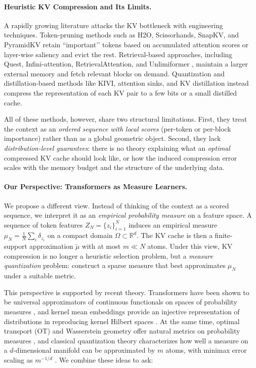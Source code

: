 \documentclass{article}
\theoremstyle{plain}
\theoremstyle{definition}
\theoremstyle{remark}
\begin{document}
\paragraph{Heuristic KV Compression and Its Limits.}
A rapidly growing literature attacks the KV bottleneck with engineering techniques. Token-pruning methods such as H2O, Scissorhands, SnapKV, and PyramidKV \citep{zhang2024h2o,liu2024scissorhands,li2024snapkv,zhang2024pyramidkv,ge2024model} retain “important’’ tokens based on accumulated attention scores or layer-wise saliency and evict the rest. Retrieval-based approaches, including Quest, Infini-attention, RetrievalAttention, and Unlimiformer \citep{tang2024quest,munkhdalai2024leave,gao2024retrieval,bertsch2024unlimiformer}, maintain a larger external memory and fetch relevant blocks on demand. Quantization and distillation-based methods like KIVI, attention sinks, and KV distillation \citep{liu2024kivi,xiao2024efficient,nawrot2024attention} instead compress the representation of each KV pair to a few bits or a small distilled cache.

All of these methods, however, share two structural limitations. First, they treat the context as an \emph{ordered sequence with local scores} (per-token or per-block importance) rather than as a global geometric object. Second, they lack \emph{distribution-level guarantees}: there is no theory explaining what an \emph{optimal} compressed KV cache should look like, or how the induced compression error scales with the memory budget and the structure of the underlying data.

\paragraph{Our Perspective: Transformers as Measure Learners.}
We propose a different view. Instead of thinking of the context as a scored sequence, we interpret it as an \emph{empirical probability measure} on a feature space. A sequence of token features $Z_N = \{z_i\}_{i=1}^N$ induces an empirical measure $\mu_N = \tfrac{1}{N}\sum_i \delta_{z_i}$ on a compact domain $\Omega \subset \mathbb{R}^d$. The KV cache is then a finite-support approximation $\tilde{\mu}$ with at most $m \ll N$ atoms. Under this view, KV compression is no longer a heuristic selection problem, but a \emph{measure quantization} problem: construct a sparse measure that best approximates $\mu_N$ under a suitable metric.

This perspective is supported by recent theory. Transformers have been shown to be universal approximators of continuous functionals on spaces of probability measures \citep{furuya2025transformers}, and kernel mean embeddings provide an injective representation of distributions in reproducing kernel Hilbert spaces \citep{muandet2017kernel,sriperumbudur2010hilbert}. At the same time, optimal transport (OT) and Wasserstein geometry offer natural metrics on probability measures \citep{villani2009optimal,cuturi2013sinkhorn}, and classical quantization theory characterizes how well a measure on a $d$-dimensional manifold can be approximated by $m$ atoms, with minimax error scaling as $m^{-1/d}$ \citep{graf2000foundations}. We combine these ideas to ask:
\end{document}
